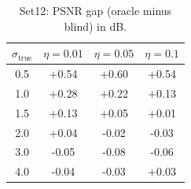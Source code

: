 \begin{table}[h]
\centering
\begin{tabular}{cccc}
\toprule
$\sigma_{\text{true}}$ & $\eta = 0.01$ & $\eta = 0.05$ & $\eta = 0.1$ \\
\midrule
0.5 & +0.54 & +0.60 & +0.54 \\
1.0 & +0.28 & +0.22 & +0.13 \\
1.5 & +0.13 & +0.05 & +0.01 \\
2.0 & +0.04 & -0.02 & -0.03 \\
3.0 & -0.05 & -0.08 & -0.06 \\
4.0 & -0.04 & -0.03 & +0.03 \\
\bottomrule
\end{tabular}
\caption{Set12: PSNR gap (oracle minus blind) in dB.}
\label{tab:psnr_gap_set12}
\end{table}
